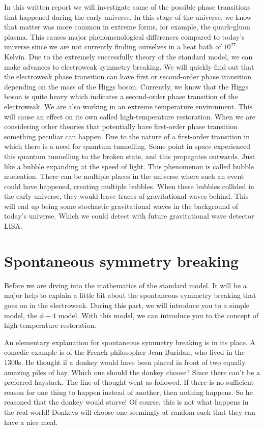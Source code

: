 \documentclass{article}
\numberwithin{equation}{section}
\begin{document}
In this written report we will investigate some of the possible phase transitions that happened during the early universe. 
In this stage of the universe, we know that matter was more common in extreme forms, for example, the quark-gluon plasma.
This causes major phenomenological differences compared to today's universe since we are not currently finding ourselves in a heat bath of $10^{27}$ Kelvin.
Due to the extremely successfully theory of the standard model, we can make advances to electroweak symmetry breaking.
We will quickly find out that the electroweak phase transition can have first or second-order phase transition depending on the mass of the Higgs boson.
Currently, we know that the Higgs boson is quite heavy which indicates a second-order phase transition of the electroweak.
We are also working in an extreme temperature environment.
This will cause an effect on its own called high-temperature restoration.
When we are considering other theories that potentially have first-order phase transition something peculiar can happen.
Due to the nature of a first-order transition in which there is a need for quantum tunnelling.
Some point in space experienced this quantum tunnelling to the broken state, and this propagates outwards. 
Just like a bubble expanding at the speed of light.
This phenomenon is called bubble nucleation.
There can be multiple places in the universe where such an event could have happened, creating multiple bubbles.
When these bubbles collided in the early universe, they would leave traces of gravitational waves behind.
This will end up being some stochastic gravitational waves in the background of today's universe.
Which we could detect with future gravitational wave detector LISA.


\section{Spontaneous symmetry breaking}

Before we are diving into the mathematics of the standard model.
It will be a major help to explain a little bit about the spontaneous symmetry breaking that goes on in the electroweak.
During this part, we will introduce you to a simple model, the $\phi-4$ model.
With this model, we can introduce you to the concept of high-temperature restoration.

\vspace{20px}

An elementary explanation for spontaneous symmetry breaking is in its place.
A comedic example is of the French philosopher Jean Buridan, who lived in the 1300s.
He thought if a donkey would have been placed in front of two equally amazing piles of hay.
Which one should the donkey choose?
Since there can't be a preferred haystack. 
The line of thought went as followed.
If there is no sufficient reason for one thing to happen instead of another, then nothing happens.
So he reasoned that the donkey would starve!
Of course, this is not what happens in the real world! 
Donkeys will choose one seemingly at random such that they can have a nice meal.
\end{document}
